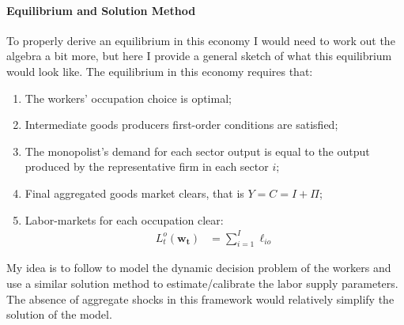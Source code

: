 \documentclass[english,letter,11pt,twoside]{article}
\begin{document}
\paragraph*{Equilibrium and Solution Method} To properly derive an equilibrium in this economy I would need to work out the algebra a bit more, but here I provide a general sketch of what this equilibrium would look like. The equilibrium in this economy requires that:
\begin{enumerate}
	\item The workers' occupation choice is optimal;
	\item Intermediate goods producers first-order conditions are satisfied;
	\item The monopolist's demand for each sector output is equal to the output produced by the representative firm in each sector $i$;
	\item Final aggregated goods market clears, that is $Y = C = I + \Pi$;
	\item Labor-markets for each occupation clear:
	\begin{align*}
		L^{o}_t\left( \mathbf{w_t} \right) &= \sum_{i = 1}^I \ell_{io}
	\end{align*}
\end{enumerate}

My idea is to follow \cite{rust1987optimal} to model the dynamic decision problem of the workers and use a similar solution method to estimate/calibrate the labor supply parameters. The absence of aggregate shocks in this framework would relatively simplify the solution of the model.


\clearpage



\end{document}
